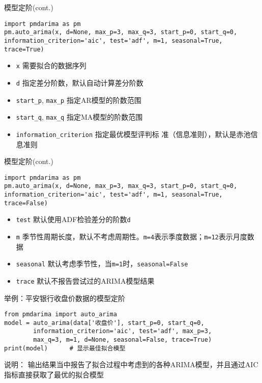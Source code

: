 \documentclass[t]{beamer}
\begin{document}
\begin{frame}[fragile]{模型定阶(cont.)}
\begin{lstlisting}
import pmdarima as pm
pm.auto_arima(x, d=None, max_p=3, max_q=3, start_p=0, start_q=0, information_criterion='aic', test='adf', m=1, seasonal=True, trace=True)
\end{lstlisting}
\begin{itemize}
    \item \verb|x| 需要拟合的数据序列
    \item \verb|d| 指定差分阶数，默认自动计算差分阶数
    \item \verb|start_p|, \verb|max_p| 指定AR模型的阶数范围
    \item \verb|start_q|, \verb|max_q| 指定MA模型的阶数范围
    \item \verb|information_criterion| 指定最优模型评判标
    准（信息准则），默认是赤池信息准则
\end{itemize}


\end{frame}

\begin{frame}[fragile]{模型定阶(cont.)}
\begin{lstlisting}
import pmdarima as pm
pm.auto_arima(x, d=None, max_p=3, max_q=3, start_p=0, start_q=0, information_criterion='aic', test='adf', m=1, seasonal=True, trace=False)
\end{lstlisting}
\begin{itemize}
    \item \verb|test| 默认使用ADF检验差分的阶数\verb|d|
    \item \verb|m| 季节性周期长度，默认不考虑周期性。\verb|m=4|表示季度数据；\verb|m=12|表示月度数据
    \item \verb|seasonal| 默认考虑季节性，当\verb|m=1|时，\verb|seasonal=False|
    \item \verb|trace| 默认不报告尝试过的ARIMA模型结果
\end{itemize}


\end{frame}

\begin{frame}[fragile]{举例：平安银行收盘价数据的模型定阶}
\begin{lstlisting}
from pmdarima import auto_arima
model = auto_arima(data['收盘价'], start_p=0, start_q=0, 
        information_criterion='aic', test='adf', max_p=3, 
        max_q=3, m=1, d=None, seasonal=False, trace=True) 
print(model)      # 显示最佳拟合模型
\end{lstlisting}

\begin{block}{说明：}
输出结果当中报告了拟合过程中考虑到的各种ARIMA模型，并且通过AIC指标直接获取了最优的拟合模型
\end{block}
\end{frame}
\end{document}
